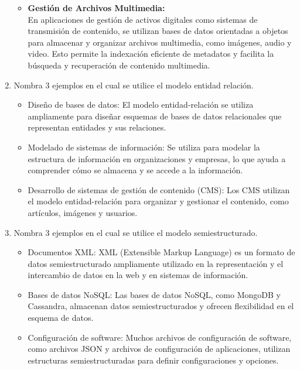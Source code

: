 \documentclass[a4paper,12pt]{article}
\begin{document}
\begin{enumerate}
\begin{itemize}
      \item \textcolor{water}{\textbf{Gestión de Archivos Multimedia:}}\\
       En aplicaciones de gestión de activos digitales como sistemas de transmisión de contenido,
        se utilizan bases de datos orientadas a objetos para almacenar y organizar archivos multimedia,
        como imágenes, audio y video. Esto permite la indexación eficiente de metadatos y facilita la búsqueda y recuperación 
        de contenido multimedia.
    \end{itemize}
    \thispagestyle{fancy} %
    \item \textcolor{sun}{Nombra 3 ejemplos en el cual se utilice el modelo entidad relación.}    
    \begin{itemize}
      \item Diseño de bases de datos: El modelo entidad-relación se utiliza ampliamente para diseñar esquemas de bases de datos relacionales que representan entidades y sus relaciones.
      \item Modelado de sistemas de información: Se utiliza para modelar la estructura de información en organizaciones y empresas, lo que ayuda a comprender cómo se almacena y se accede a la información.
      \item Desarrollo de sistemas de gestión de contenido (CMS): Los CMS utilizan el modelo entidad-relación para organizar y gestionar el contenido, como artículos, imágenes y usuarios.
    \end{itemize}
    \thispagestyle{fancy} %
    \item \textcolor{sun}{Nombra 3 ejemplos en el cual se utilice el modelo semiestructurado.}
    \begin{itemize}
      \item Documentos XML: XML (Extensible Markup Language) es un formato de datos semiestructurado ampliamente utilizado en la representación y el intercambio de datos en la web y en sistemas de información.
      \item Bases de datos NoSQL: Las bases de datos NoSQL, como MongoDB y Cassandra, almacenan datos semiestructurados y ofrecen flexibilidad en el esquema de datos.
      \item Configuración de software: Muchos archivos de configuración de software, como archivos JSON y archivos de configuración de aplicaciones, utilizan estructuras semiestructuradas para definir configuraciones y opciones.
    \end{itemize}
\end{enumerate}





\end{document}
